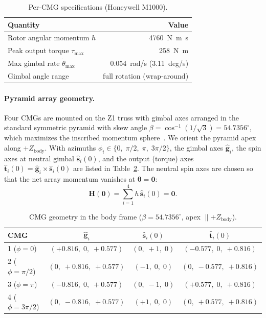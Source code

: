 \documentclass[conference]{IEEEtran}
\begin{document}
\begin{table}[h]
\centering
\caption{Per-CMG specifications (Honeywell M1000).}
\label{tab:cmg-specs}
\begin{tabular}{@{}lr@{}}
\toprule
Quantity & Value \\
\midrule
Rotor angular momentum $h$          & \SI{4760}{N.m.s} \\
Peak output torque $\tau_{\max}$    & \SI{258}{N.m} \\
Max gimbal rate $\dot\theta_{\max}$ & \SI{0.054}{rad/s} (\SI{3.11}{deg/s}) \\
Gimbal angle range                  & full rotation (wrap-around) \\
\bottomrule
\end{tabular}
\end{table}

\paragraph{Pyramid array geometry.}  Four CMGs are mounted on the Z1
truss with gimbal axes arranged in the standard symmetric pyramid with
skew angle $\beta = \cos^{-1}(1/\sqrt{3}) = 54.7356^\circ$, which
maximizes the inscribed momentum sphere~\cite{wie2008}.  We orient the
pyramid apex along $+Z_\text{body}$.  With azimuths
$\phi_i \in \{0,\; \pi/2,\; \pi,\; 3\pi/2\}$, the gimbal axes
$\hat{\bm g}_i$, the spin axes at neutral gimbal $\hat{\bm s}_i(0)$,
and the output (torque) axes $\hat{\bm t}_i(0) = \hat{\bm g}_i
\times \hat{\bm s}_i(0)$ are listed in
Table~\ref{tab:cmg-geom}.  The neutral spin axes are chosen so that the
net array momentum vanishes at $\bm\theta = \bm 0$:
\begin{equation}
  \bm H(\bm 0) = \sum_{i=1}^{4} h\,\hat{\bm s}_i(0) = \bm 0.
\end{equation}

\begin{table}[h]
\centering
\caption{CMG geometry in the body frame ($\beta = 54.7356^\circ$,
apex $\parallel +Z_\text{body}$).}
\label{tab:cmg-geom}
\small
\setlength{\tabcolsep}{3.5pt}
\begin{tabular}{@{}lccc@{}}
\toprule
CMG & $\hat{\bm g}_i$ & $\hat{\bm s}_i(0)$ & $\hat{\bm t}_i(0)$ \\
\midrule
1 ($\phi = 0$)        & $(+0.816,\;0,\;+0.577)$ & $(0,\;+1,\;0)$ & $(-0.577,\;0,\;+0.816)$ \\
2 ($\phi = \pi/2$)    & $(0,\;+0.816,\;+0.577)$ & $(-1,\;0,\;0)$ & $(0,\;-0.577,\;+0.816)$ \\
3 ($\phi = \pi$)      & $(-0.816,\;0,\;+0.577)$ & $(0,\;-1,\;0)$ & $(+0.577,\;0,\;+0.816)$ \\
4 ($\phi = 3\pi/2$)   & $(0,\;-0.816,\;+0.577)$ & $(+1,\;0,\;0)$ & $(0,\;+0.577,\;+0.816)$ \\
\bottomrule
\end{tabular}
\end{table}
\end{document}

